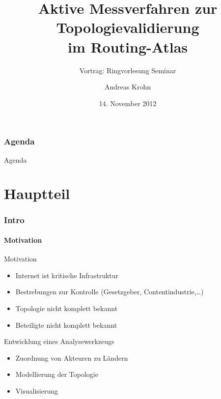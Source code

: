 \documentclass[ngerman,compress,hyperref={bookmarks}]{beamer}
\title[Aktive Messverfahren z. Topologievalidierung]{Aktive Messverfahren zur Topologievalidierung\\im Routing-Atlas}
\subtitle{Vortrag: Ringvorlesung Seminar}
\author{Andreas Krohn}
\institute[HAW]{Hochschule für Angewandte Wissenschaften Hamburg}
\date[WS 2012/13]{14. November 2012}
\begin{document}
\frame[plain]{\titlepage}

\section*{Agenda}
\begin{frame}{Agenda} \setcounter{tocdepth}{1} \tableofcontents[part=1] \setcounter{tocdepth}{3} \end{frame}

\part{Hauptteil}
\section{Intro}
\subsection{Motivation}
\begin{frame}[allowframebreaks]{Motivation}
  \begin{itemize}
    \item Internet ist kritische Infrastruktur
    \item Bestrebungen zur Kontrolle (Gesetzgeber, Contentindustrie,\ldots)
    \item Topologie nicht komplett bekannt
    \item Beteiligte nicht komplett bekannt
  \end{itemize}
  \framebreak
  Entwicklung eines Analysewerkzeugs
  \begin{itemize}
    \item Zuordnung von Akteuren zu Ländern
    \item Modellierung der Topologie
    \item Visualisierung
  \end{itemize}
\end{frame}
\end{document}
